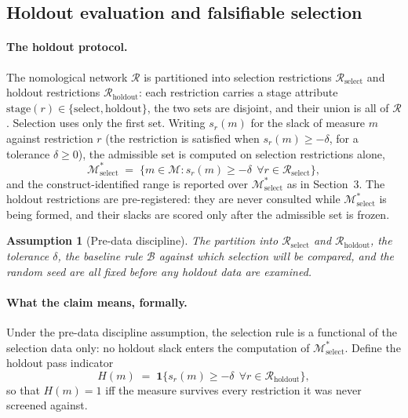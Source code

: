 \documentclass[10pt,letterpaper]{article}
\newtheorem{assumption}{Assumption}[section]
\newcommand{\M}{\ensuremath{\mathcal{M}}}
\begin{document}
\subsection{Holdout evaluation and falsifiable selection}

\paragraph{The holdout protocol.}
The nomological network $\mathcal{R}$ is partitioned into selection restrictions $\mathcal{R}_{\mathrm{select}}$ and holdout restrictions $\mathcal{R}_{\mathrm{holdout}}$: each restriction carries a stage attribute $\mathrm{stage}(r) \in \{\mathrm{select}, \mathrm{holdout}\}$, the two sets are disjoint, and their union is all of $\mathcal{R}$. Selection uses only the first set. Writing $s_r(m)$ for the slack of measure $m$ against restriction $r$ (the restriction is satisfied when $s_r(m) \ge -\delta$, for a tolerance $\delta \ge 0$), the admissible set is computed on selection restrictions alone,
\[
\M^*_{\mathrm{select}} \;=\; \bigl\{ m \in \M : s_r(m) \ge -\delta \ \ \forall r \in \mathcal{R}_{\mathrm{select}} \bigr\},
\]
and the construct-identified range is reported over $\M^*_{\mathrm{select}}$ as in Section~3. The holdout restrictions are pre-registered: they are never consulted while $\M^*_{\mathrm{select}}$ is being formed, and their slacks are scored only after the admissible set is frozen.

\begin{assumption}[Pre-data discipline]
The partition into $\mathcal{R}_{\mathrm{select}}$ and $\mathcal{R}_{\mathrm{holdout}}$, the tolerance $\delta$, the baseline rule $\mathcal{B}$ against which selection will be compared, and the random seed are all fixed before any holdout data are examined.
\end{assumption}

\paragraph{What the claim means, formally.}
Under the pre-data discipline assumption, the selection rule is a functional of the selection data only: no holdout slack enters the computation of $\M^*_{\mathrm{select}}$. Define the holdout pass indicator
\[
H(m) \;=\; \mathbf{1}\bigl\{ s_r(m) \ge -\delta \ \ \forall r \in \mathcal{R}_{\mathrm{holdout}} \bigr\},
\]
so that $H(m)=1$ iff the measure survives every restriction it was never screened against.
\end{document}
